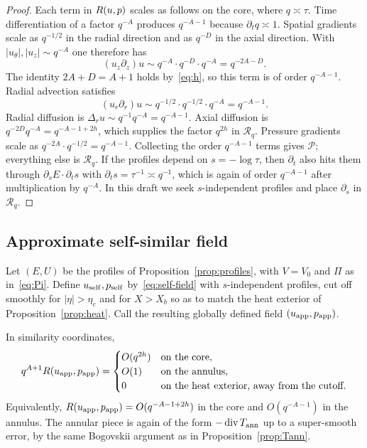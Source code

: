 \begin{proof}
Each term in $R(u,p)$ scales as follows on the core, where $q\asymp\tau$. Time differentiation of a factor $q^{-A}$ produces $q^{-A-1}$ because $\partial_t q\asymp 1$. Spatial gradients scale as $q^{-1/2}$ in the radial direction and as $q^{-D}$ in the axial direction. With $|u_\theta|,|u_z|\sim q^{-A}$ one therefore has
\[
(u_z\partial_z)u\sim q^{-A}\cdot q^{-D}\cdot q^{-A}=q^{-2A-D}.
\]
The identity $2A+D=A+1$ holds by~\eqref{eq:h}, so this term is of order $q^{-A-1}$. Radial advection satisfies
\[
(u_r\partial_r)u\sim q^{-1/2}\cdot q^{-1/2}\cdot q^{-A}=q^{-A-1}.
\]
Radial diffusion is $\Delta_r u\sim q^{-1}q^{-A}=q^{-A-1}$. Axial diffusion is $q^{-2D}q^{-A}=q^{-A-1+2h}$, which supplies the factor $q^{2h}$ in $\mathcal R_q$. Pressure gradients scale as $q^{-2A}\cdot q^{-1/2}=q^{-A-1}$. Collecting the order $q^{-A-1}$ terms gives $\mathcal P$; everything else is $\mathcal R_q$. If the profiles depend on $s=-\log\tau$, then $\partial_t$ also hits them through $\partial_s E\cdot\partial_t s$ with $\partial_t s=\tau^{-1}\asymp q^{-1}$, which is again of order $q^{-A-1}$ after multiplication by $q^{-A}$. In this draft we seek $s$-independent profiles and place $\partial_s$ in $\mathcal R_q$.
\end{proof}

\subsection{Approximate self-similar field}
\label{sec:approx-ss}

\begin{construction}
\label{con:ss}
Let $(E,U)$ be the profiles of Proposition~\ref{prop:profiles}, with $V=V_0$ and $\Pi$ as in~\eqref{eq:Pi}. Define $u_{\mathrm{self}},p_{\mathrm{self}}$ by~\eqref{eq:self-field} with $s$-independent profiles, cut off smoothly for $|\eta|>\eta_c$ and for $X>X_b$ so as to match the heat exterior of Proposition~\ref{prop:heat}. Call the resulting globally defined field $(u_{\mathrm{app}},p_{\mathrm{app}})$.
\end{construction}

\begin{lemma}
\label{lem:app-residual}
In similarity coordinates,
\begin{equation}
\label{eq:app-res}
q^{A+1}R(u_{\mathrm{app}},p_{\mathrm{app}})
=
\begin{cases}
O(q^{2h}) & \text{on the core},\\
O(1) & \text{on the annulus},\\
0 & \text{on the heat exterior, away from the cutoff}.
\end{cases}
\end{equation}
Equivalently, $R(u_{\mathrm{app}},p_{\mathrm{app}})=O(q^{-A-1+2h})$ in the core and $O(q^{-A-1})$ in the annulus. The annular piece is again of the form $-\operatorname{div} T_{\mathrm{ann}}$ up to a super-smooth error, by the same {B}ogovskii argument as in Proposition~\ref{prop:Tann}.
\end{lemma}

